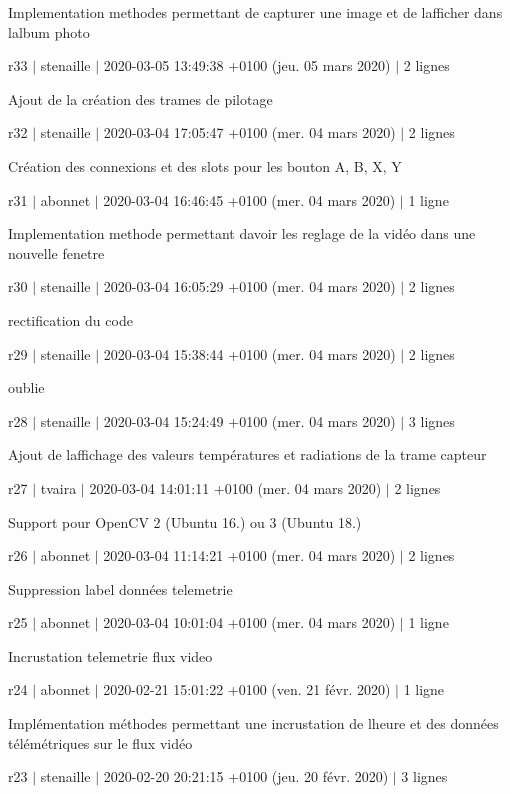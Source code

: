 Implementation methodes permettant de capturer une image et de l\textquotesingle{}afficher dans l\textquotesingle{}album photo

r33 $\vert$ stenaille $\vert$ 2020-\/03-\/05 13\+:49\+:38 +0100 (jeu. 05 mars 2020) $\vert$ 2 lignes

Ajout de la création des trames de pilotage

r32 $\vert$ stenaille $\vert$ 2020-\/03-\/04 17\+:05\+:47 +0100 (mer. 04 mars 2020) $\vert$ 2 lignes

Création des connexions et des slots pour les bouton A, B, X, Y

r31 $\vert$ abonnet $\vert$ 2020-\/03-\/04 16\+:46\+:45 +0100 (mer. 04 mars 2020) $\vert$ 1 ligne

Implementation methode permettant d\textquotesingle{}avoir les reglage de la vidéo dans une nouvelle fenetre

r30 $\vert$ stenaille $\vert$ 2020-\/03-\/04 16\+:05\+:29 +0100 (mer. 04 mars 2020) $\vert$ 2 lignes

rectification du code

r29 $\vert$ stenaille $\vert$ 2020-\/03-\/04 15\+:38\+:44 +0100 (mer. 04 mars 2020) $\vert$ 2 lignes

oublie

r28 $\vert$ stenaille $\vert$ 2020-\/03-\/04 15\+:24\+:49 +0100 (mer. 04 mars 2020) $\vert$ 3 lignes

Ajout de l\textquotesingle{}affichage des valeurs températures et radiations de la trame capteur

r27 $\vert$ tvaira $\vert$ 2020-\/03-\/04 14\+:01\+:11 +0100 (mer. 04 mars 2020) $\vert$ 2 lignes

Support pour Open\+CV 2 (Ubuntu 16.) ou 3 (Ubuntu 18.)

r26 $\vert$ abonnet $\vert$ 2020-\/03-\/04 11\+:14\+:21 +0100 (mer. 04 mars 2020) $\vert$ 2 lignes

Suppression label données telemetrie

r25 $\vert$ abonnet $\vert$ 2020-\/03-\/04 10\+:01\+:04 +0100 (mer. 04 mars 2020) $\vert$ 1 ligne

Incrustation telemetrie flux video

r24 $\vert$ abonnet $\vert$ 2020-\/02-\/21 15\+:01\+:22 +0100 (ven. 21 févr. 2020) $\vert$ 1 ligne

Implémentation méthodes permettant une incrustation de l\textquotesingle{}heure et des données télémétriques sur le flux vidéo

r23 $\vert$ stenaille $\vert$ 2020-\/02-\/20 20\+:21\+:15 +0100 (jeu. 20 févr. 2020) $\vert$ 3 lignes

